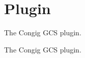 \hypertarget{group___congig}{\section{Plugin}
\label{group___congig}
}


The Congig G\-C\-S plugin.  


The Congig G\-C\-S plugin. 